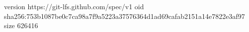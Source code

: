 version https://git-lfs.github.com/spec/v1
oid sha256:753b1087be0c7ca98a7f9a5223a37576364d1ad69cafab2151a14e7822e3af97
size 626416
